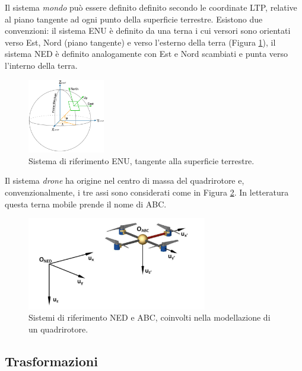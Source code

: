 Il sistema \emph{mondo} può essere definito definito secondo le coordinate \ac{LTP}, relative al piano tangente ad ogni punto della superficie terrestre. Esistono due convenzioni: il sistema \ac{ENU} è definito da una terna i cui versori sono orientati verso Est, Nord (piano tangente) e verso l'esterno della terra (Figura \ref{fig:fixedRef}), il sistema \ac{NED} è definito analogamente con Est e Nord scambiati e punta verso l'interno della terra.

\begin{figure}[H]
    \centering
    \includegraphics[width=0.3\textwidth]{gfx/ltp_enu}
    \caption[Sistema di riferimento \acs{ENU}.]{Sistema di riferimento \acs{ENU}, tangente alla superficie terrestre.}
    \label{fig:fixedRef}
\end{figure}

Il sistema \emph{drone} ha origine nel centro di massa del quadrirotore e, convenzionalmente, i tre assi sono considerati come in Figura \ref{fig:abc_frame}. In letteratura questa terna mobile prende il nome di \ac{ABC}.

\begin{figure}[H]
    \centering
    \includegraphics[width=0.7\textwidth]{gfx/abc_frame}
    \caption[Sistemi di riferimento \acs{NED} e \acs{ABC}.]{Sistemi di riferimento \acs{NED} e \acs{ABC}, coinvolti nella modellazione di un quadrirotore.}
    \label{fig:abc_frame}
\end{figure}

\subsection{Trasformazioni}

